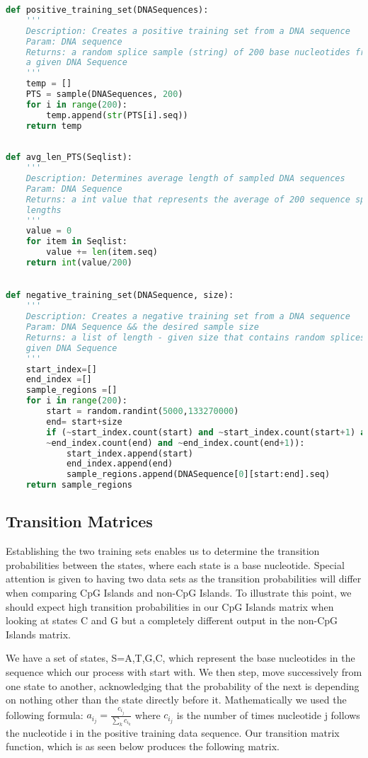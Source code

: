 \documentclass[paper=letter, fontsize=12pt]{article}
\begin{document}
\begin{lstlisting}[language=Python]
def positive_training_set(DNASequences):
    '''
    Description: Creates a positive training set from a DNA sequence
    Param: DNA sequence
    Returns: a random splice sample (string) of 200 base nucleotides from
    a given DNA Sequence
    '''
    temp = []
    PTS = sample(DNASequences, 200)
    for i in range(200):
        temp.append(str(PTS[i].seq))
    return temp
    
    
def avg_len_PTS(Seqlist):
    '''
    Description: Determines average length of sampled DNA sequences
    Param: DNA Sequence
    Returns: a int value that represents the average of 200 sequence splice
    lengths
    '''
    value = 0 
    for item in Seqlist:
        value += len(item.seq)
    return int(value/200)
        

def negative_training_set(DNASequence, size):
    '''
    Description: Creates a negative training set from a DNA sequence
    Param: DNA Sequence && the desired sample size
    Returns: a list of length - given size that contains random splices of a
    given DNA Sequence
    '''
    start_index=[]
    end_index =[]
    sample_regions =[]
    for i in range(200):
        start = random.randint(5000,133270000)
        end= start+size
        if (~start_index.count(start) and ~start_index.count(start+1) and
        ~end_index.count(end) and ~end_index.count(end+1)):
            start_index.append(start)
            end_index.append(end)
            sample_regions.append(DNASequence[0][start:end].seq)
    return sample_regions
\end{lstlisting}



\subsection{Transition Matrices}
Establishing the two training sets enables us to determine the transition probabilities between the states, where each state is a base nucleotide. Special attention is given to having two data sets as the transition probabilities will differ when comparing CpG Islands and non-CpG Islands. To illustrate this point, we should expect high transition probabilities in our CpG Islands matrix when looking at states C and G but a completely different output in the non-CpG Islands matrix.

We have a set of states, S={A,T,G,C}, which represent the base nucleotides in the sequence which our process with start with. We then step, move successively from one state to another, acknowledging that the probability of the next is depending on nothing other than the state directly before it. Mathematically we used the following formula: $a_{i_j} = \frac{c_{i_j}}{\sum_{k}c_{i_k}}$ where $c_{i_j}$ is the number of times nucleotide j follows the nucleotide i in the positive training data sequence. Our transition matrix function, which is as seen below produces the following matrix.
\end{document}
